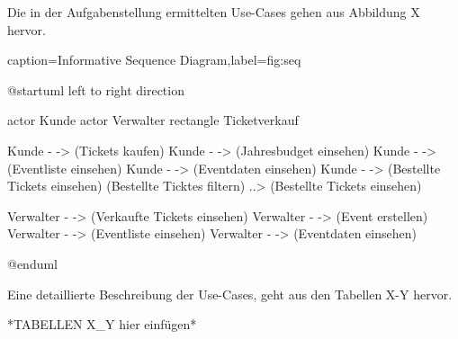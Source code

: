 Die in der Aufgabenstellung ermittelten Use-Cases gehen aus Abbildung X hervor.

\begin{dhbwfigure}{caption=Informative Sequence Diagram,label=fig:seq}
    \begin{plantuml}
        @startuml
            left to right direction

            actor Kunde
            actor Verwalter
            rectangle Ticketverkauf {
                Kunde - -> (Tickets kaufen)
                Kunde - -> (Jahresbudget einsehen)
                Kunde - -> (Eventliste einsehen)
                Kunde - -> (Eventdaten einsehen)
                Kunde - -> (Bestellte Tickets einsehen)
                (Bestellte Ticktes filtern) ..> (Bestellte Tickets einsehen)

                Verwalter - -> (Verkaufte Tickets einsehen)
                Verwalter - -> (Event erstellen)
                Verwalter - -> (Eventliste einsehen)
                Verwalter - -> (Eventdaten einsehen)
            }
        @enduml
    \end{plantuml}
\end{dhbwfigure}

Eine detaillierte Beschreibung der Use-Cases, geht aus den Tabellen X-Y hervor.

*TABELLEN X_Y hier einfügen*
